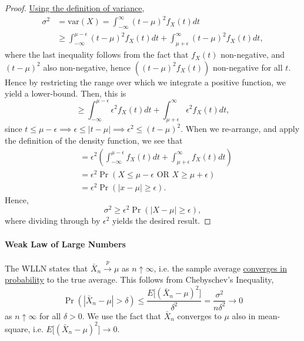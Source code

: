 \documentclass[12pt]{article}\usepackage[]{graphicx}\usepackage[]{color}
\begin{document}
\begin{proof}   
\ul{Using the definition of variance},
\begin{align*}     
  \sigma^2 &= \textrm{var}(X) = \int_{-\infty}^\infty (t - \mu)^2 f_X(t) dt \\
           &\geq \int_{-\infty}^{\mu - \epsilon} (t - \mu)^2 f_X(t) dt + \int_{\mu + \epsilon}^\infty (t- \mu)^2 f_X(t) dt,   
\end{align*}
  where the last inequality follows from the fact that $f_X(t)$ non-negative, and $(t-\mu)^2$ also non-negative, hence $\left((t-\mu)^2f_X(t)\right)$
non-negative for all $t$. Hence by restricting the range over which we integrate a positive function, we yield a lower-bound. Then, this is
\[
\geq \int_{-\infty}^{\mu - \epsilon} \epsilon^2 f_X(t) dt + \int_{\mu + \epsilon}^\infty \epsilon^2 f_X(t) dt,
\]
since $t \leq \mu - \epsilon \implies \epsilon \leq |t-\mu| \implies \epsilon^2 \leq (t-\mu)^2$. When we re-arrange, and apply the definition of the density function, we see that
\begin{align*}   &= \epsilon^2 \left(\int_{-\infty}^{\mu - \epsilon} f_X(t) dt + \int_{\mu + \epsilon}^{\infty} f_X(t) dt \right) \\
  &= \epsilon^2 \Pr(X \leq \mu - \epsilon \textrm{ OR } X \geq \mu + \epsilon) \\
  &= \epsilon^2 \Pr \left( |x - \mu| \geq \epsilon \right).  \end{align*}
Hence,
\[
  \sigma^2 \geq \epsilon^2 \Pr(|X-\mu| \geq \epsilon),
\]
where dividing through by $\epsilon^2$ yields the desired result. 
\end{proof}

\paragraph{Weak Law of Large Numbers} The WLLN states that $\bar{X}_n \overset{p}{\longrightarrow} \mu$ as $n \uparrow \infty$, i.e. the sample average 
\ul{converges in probability} to the true average. This follows from Chebyschev's Inequality,
\[
\Pr(|\bar{X}_n - \mu| > \delta) \leq \frac{E \big[ (\bar{X}_n - \mu)^2 \big]}{\delta^2} = \frac{\sigma^2}{n\delta^2} \longrightarrow 0
\]
as $n \uparrow \infty$ for all $\delta > 0$. We use the fact that $\bar{X}_n$ converges to $\mu$ also in mean-square, i.e. $E\big[ (\bar{X}_n - \mu)^2 \big] \longrightarrow 0$.
\end{document}
